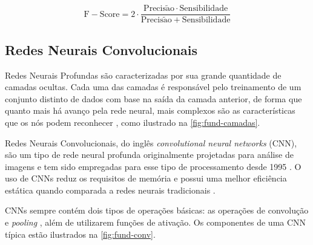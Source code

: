 \begin{equation} \label{eq:fund-fscore}
\mathrm{
  F-Score = 2 \cdot \frac{Precis\tilde{a}o \cdot Sensibilidade}{Precis\tilde{a}o + Sensibilidade}
}
\end{equation}



\subsection{Redes Neurais Convolucionais} \label{cap:fund-ia-rn-conv}
Redes Neurais Profundas são caracterizadas por sua grande quantidade de camadas ocultas. Cada uma das camadas é responsável pelo treinamento de um conjunto distinto de dados com base na saída da camada anterior, de forma que quanto mais há avanço pela rede neural, mais complexos são as características que os nós podem reconhecer \cite{ref:Nicholson}, como ilustrado na \autoref{fig:fund-camadas}.

Redes Neurais Convolucionais, do inglês \textit{convolutional neural networks} (CNN), são um tipo de rede neural profunda originalmente projetadas para análise de imagens \cite{ref:Eden-Ierapetritou-Towler} e tem sido empregadas para esse tipo de processamento desde 1995 \cite{ref:Yan}. O uso de CNNs reduz os requisitos de memória e possui uma melhor eficiência estática quando comparada a redes neurais tradicionais \cite{ref:Goodfellow-Bengio-Courville}.

CNNs sempre contém dois tipos de operações básicas: as operações de convolução e \textit{pooling} \cite{ref:Eden-Ierapetritou-Towler}, além de utilizarem funções de ativação. Os componentes de uma CNN típica estão ilustrados na \autoref{fig:fund-conv}.

